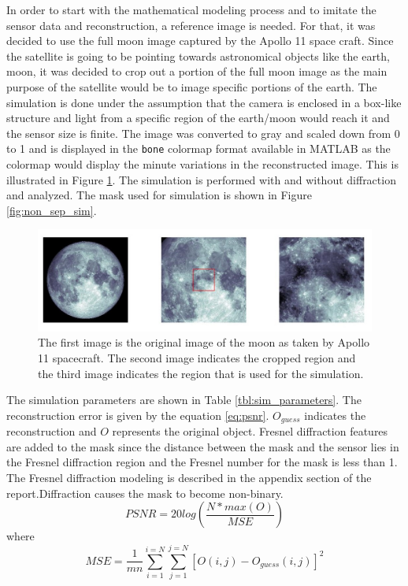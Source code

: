 In order to start with the mathematical modeling process and to imitate the sensor data and reconstruction, a reference image is needed. For that, it was decided to use the full moon image captured by the Apollo 11 space craft\cite{MoonImage}. Since the satellite is going to be pointing towards astronomical objects like the earth, moon, it was decided to crop out a portion of the full moon image as the main purpose of the satellite would be to image specific portions of the earth. The simulation is done under the assumption that the camera is enclosed in a box-like structure and light from a specific region of the earth/moon would reach it and the sensor size is finite. The image was converted to gray and scaled down from 0 to 1 and is displayed in the \texttt{bone} colormap format available in MATLAB as the colormap would display the minute variations in the reconstructed image. This is illustrated in Figure \ref{fig:moon_image}. The simulation is performed with and without diffraction and analyzed. The mask used for simulation is shown in Figure \ref{fig:non_sep_sim}.
\begin{figure}[ht]
\includegraphics[scale = 0.50]{pics/MoonImagePortion}
\caption{The first image is the original image of the moon as taken by Apollo 11 spacecraft. The second image indicates the cropped region and the third image indicates the region that is used for the simulation.}
\label{fig:moon_image}
\end{figure}
The simulation parameters are shown in Table \ref{tbl:sim_parameters}. The reconstruction error is given by the equation \ref{eq:psnr}. $O_{guess}$ indicates the reconstruction and $O$ represents the original object. Fresnel diffraction features are added to the mask since the distance between the mask and the sensor lies in the Fresnel diffraction region and the Fresnel number for the mask is less than  1. The Fresnel diffraction modeling is described in the appendix section of the report.Diffraction causes the mask to become non-binary.
\begin{equation}
PSNR = 20log(\frac{N*max(O)}{MSE})
\label{eq:psnr}
\end{equation}
where 
\begin{equation}
MSE = \frac{1}{mn}\sum_{i=1}^{i=N}\sum_{j=1}^{j=N}[O(i,j) - O_{guess}(i,j)]^2
\end{equation}

